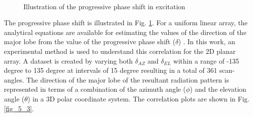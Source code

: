 \begin{figure}
  \centering
   ~~~~
  \\
  \caption{Illustration of the progressive phase shift in excitation} \label{fig_5_2}
\end{figure}

The progressive phase shift is illustrated in Fig. \ref{fig_5_2}. For a uniform linear array, the analytical equations are available for estimating the values of the direction of the major lobe from the value of the progressive phase shift ($\delta$) \cite{phasedArrayHandbook}. In this work, an experimental method is used to understand this correlation for the 2D planar array. A dataset is created by varying both $\delta_{AZ}$ and $\delta_{EL}$ within a range of -135 degree to 135 degree at intervals of 15 degree resulting in a total of 361 scan-angles. The direction of the major lobe of the resultant radiation pattern is represented in terms of a combination of the azimuth angle ($\phi$) and the elevation angle ($\theta$) in a 3D polar coordinate system. The correlation plots are shown in Fig. \ref{fig_5_3}.

